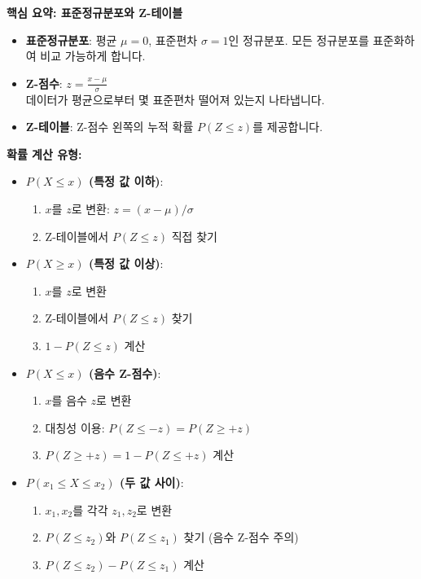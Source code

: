 \documentclass[11pt,a4paper]{article}
\theoremstyle{definition}
\begin{document}
\begin{summarybox}
\textbf{핵심 요약: 표준정규분포와 Z-테이블}
\begin{itemize}
    \item \textbf{표준정규분포}: 평균 $\mu=0$, 표준편차 $\sigma=1$인 정규분포. 모든 정규분포를 표준화하여 비교 가능하게 합니다.
    \item \textbf{Z-점수}: $z = \frac{x - \mu}{\sigma}$ \\
    데이터가 평균으로부터 몇 표준편차 떨어져 있는지 나타냅니다.
    \item \textbf{Z-테이블}: Z-점수 왼쪽의 누적 확률 $P(Z \le z)$를 제공합니다.
\end{itemize}

\textbf{확률 계산 유형:}
\begin{itemize}
    \item \textbf{$P(X \le x)$ (특정 값 이하)}:
        \begin{enumerate}
            \item $x$를 $z$로 변환: $z = (x - \mu) / \sigma$
            \item Z-테이블에서 $P(Z \le z)$ 직접 찾기
        \end{enumerate}
    \item \textbf{$P(X \ge x)$ (특정 값 이상)}:
        \begin{enumerate}
            \item $x$를 $z$로 변환
            \item Z-테이블에서 $P(Z \le z)$ 찾기
            \item $1 - P(Z \le z)$ 계산
        \end{enumerate}
    \item \textbf{$P(X \le x)$ (음수 Z-점수)}:
        \begin{enumerate}
            \item $x$를 음수 $z$로 변환
            \item 대칭성 이용: $P(Z \le -z) = P(Z \ge +z)$
            \item $P(Z \ge +z) = 1 - P(Z \le +z)$ 계산
        \end{enumerate}
    \item \textbf{$P(x_1 \le X \le x_2)$ (두 값 사이)}:
        \begin{enumerate}
            \item $x_1, x_2$를 각각 $z_1, z_2$로 변환
            \item $P(Z \le z_2)$와 $P(Z \le z_1)$ 찾기 (음수 Z-점수 주의)
            \item $P(Z \le z_2) - P(Z \le z_1)$ 계산
        \end{enumerate}
\end{itemize}


\end{summarybox}
\end{document}

